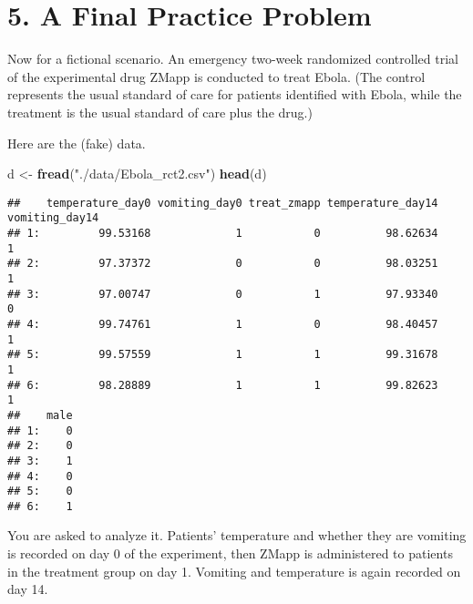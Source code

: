 \documentclass[
]{article}
\newenvironment{Shaded}{\begin{snugshade}}{\end{snugshade}}
\newcommand{\KeywordTok}[1]{\textcolor[rgb]{0.13,0.29,0.53}{\textbf{#1}}}
\newcommand{\NormalTok}[1]{#1}
\newcommand{\StringTok}[1]{\textcolor[rgb]{0.31,0.60,0.02}{#1}}
\begin{document}
\hypertarget{a-final-practice-problem}{%
\section{5. A Final Practice Problem}\label{a-final-practice-problem}}

Now for a fictional scenario. An emergency two-week randomized
controlled trial of the experimental drug ZMapp is conducted to treat
Ebola. (The control represents the usual standard of care for patients
identified with Ebola, while the treatment is the usual standard of care
plus the drug.)

Here are the (fake) data.

\begin{Shaded}
\begin{Highlighting}[]
\NormalTok{d <-}\StringTok{ }\KeywordTok{fread}\NormalTok{(}\StringTok{"./data/Ebola_rct2.csv"}\NormalTok{)}
\KeywordTok{head}\NormalTok{(d)}
\end{Highlighting}
\end{Shaded}

\begin{verbatim}
##    temperature_day0 vomiting_day0 treat_zmapp temperature_day14 vomiting_day14
## 1:         99.53168             1           0          98.62634              1
## 2:         97.37372             0           0          98.03251              1
## 3:         97.00747             0           1          97.93340              0
## 4:         99.74761             1           0          98.40457              1
## 5:         99.57559             1           1          99.31678              1
## 6:         98.28889             1           1          99.82623              1
##    male
## 1:    0
## 2:    0
## 3:    1
## 4:    0
## 5:    0
## 6:    1
\end{verbatim}

You are asked to analyze it. Patients' temperature and whether they are
vomiting is recorded on day 0 of the experiment, then ZMapp is
administered to patients in the treatment group on day 1. Vomiting and
temperature is again recorded on day 14.
\end{document}
